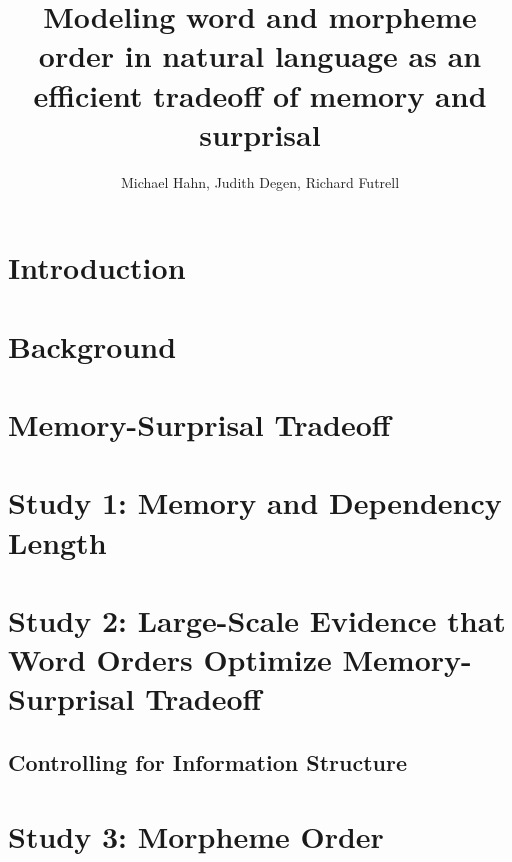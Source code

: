 \documentclass[man]{apa7}
\title{Modeling word and morpheme order in natural language as an efficient tradeoff of memory and surprisal}
\author{Michael Hahn, Judith Degen, Richard Futrell}
\affiliation{A University Somewhere}
\begin{document}
\maketitle


\section{Introduction}



\section{Background}\label{sec:background}





\section{Memory-Surprisal Tradeoff}\label{sec:ms-tradeoff}



\section{Study 1: Memory and Dependency Length}





\section{Study 2: Large-Scale Evidence that Word Orders Optimize Memory-Surprisal Tradeoff}
\label{sec:main-experiment}



\subsection{Controlling for Information Structure}\label{subsec:freedom}



\section{Study 3: Morpheme Order}


\end{document}
